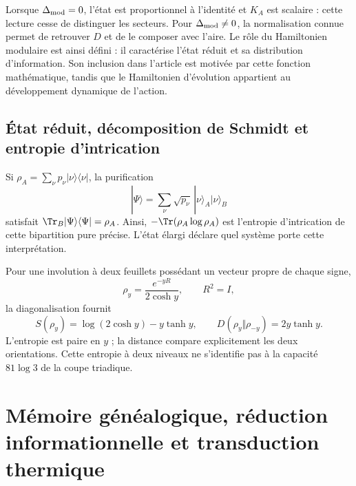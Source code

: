 Lorsque $\Delta_{\rm mod}=0$, l'état est proportionnel à l'identité
et $K_A$ est scalaire : cette lecture cesse de distinguer les secteurs.
Pour $\Delta_{\rm mod}\ne0$, la normalisation connue permet de retrouver
$D$ et de le composer avec l'aire. Le rôle du Hamiltonien
modulaire est ainsi défini : il caractérise l'état réduit et sa distribution d'information.
Son inclusion dans l'article est motivée par cette fonction mathématique,
tandis que le Hamiltonien d'évolution appartient au développement dynamique
de l'action.



\section{État réduit, décomposition de Schmidt et entropie d'intrication}
Si $\rho_A=\sum_\nu p_\nu|\nu\rangle\langle\nu|$,
la purification
\[
|\Psi\rangle=\sum_\nu\sqrt{p_\nu}\,
|\nu\rangle_A|\nu\rangle_B
\]
satisfait $\Tr_B|\Psi\rangle\langle\Psi|=\rho_A$.
Ainsi, $-\Tr(\rho_A\log\rho_A)$ est l'entropie d'intrication
de cette bipartition pure précise. L'état élargi déclare
quel système porte cette interprétation.

Pour une involution à deux feuillets possédant un vecteur propre de chaque signe,
\[
\rho_y=\frac{e^{-yR}}{2\cosh y},\qquad R^2=I,
\]
la diagonalisation fournit
\[
S(\rho_y)=\log(2\cosh y)-y\tanh y,\qquad
D(\rho_y\Vert\rho_{-y})=2y\tanh y.
\]
L'entropie est paire en $y$ ; la distance compare explicitement
les deux orientations. Cette entropie à deux niveaux ne s'identifie pas
à la capacité $81\log3$ de la coupe triadique.




\chapter{Mémoire généalogique, réduction informationnelle et transduction thermique}
\label{x_reciprocidad:v:ant:sec:ii-kb-aut-desarrollo}

